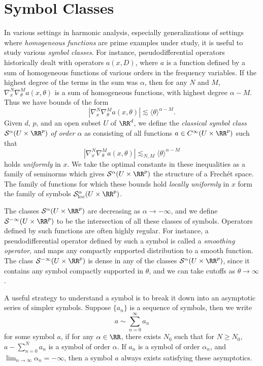 \chapter{Symbol Classes}

In various settings in harmonic analysis, especially generalizations of settings where \emph{homogeneous functions} are prime examples under study, it is useful to study various \emph{symbol classes}. For instance, pseudodifferential operators historically dealt with operators $a(x,D)$, where $a$ is a function defined by a sum of homogeneous functions of various orders in the frequency variables. If the highest degree of the terms in the sum was $\alpha$, then for any $N$ and $M$, $\nabla^N_x \nabla^M_\theta a(x,\theta)$ is a sum of homogeneous functions, with highest degree $\alpha - M$. Thus we have bounds of the form
%
\[ | \nabla^N_x \nabla^M_\theta a(x,\theta) | \lesssim \langle \theta \rangle^{\alpha - M}. \]
%
Given $d$, $p$, and an open subset $U$ of $\RR^d$, we define the \emph{classical symbol class} $\mathcal{S}^\alpha(U \times \RR^p)$ \emph{of order $\alpha$} as consisting of all functions $a \in C^\infty(U \times \RR^p)$ such that
%
\[ |\nabla^N_x \nabla^M_\theta a(x,\theta)| \lesssim_{N,M} \langle \theta \rangle^{\alpha - M} \]
%
holds \emph{uniformly} in $x$. We take the optimal constants in these inequalities as a family of seminorms which gives $\mathcal{S}^\alpha(U \times \RR^p)$ the structure of a Frech\'{e}t space. The family of functions for which these bounds hold \emph{locally uniformly} in $x$ form the family of symbols $\mathcal{S}^\alpha_{\text{loc}}(U \times \RR^p)$.

The classes $\mathcal{S}^\alpha(U \times \RR^p)$ are decreasing as $\alpha \to -\infty$, and we define $\mathcal{S}^{-\infty}(U \times \RR^p)$ to be the intersection of all these classes of symbols. Operators defined by such functions are often highly regular. For instance, a pseudodifferential operator defined by such a symbol is called a \emph{smoothing operator}, and maps any compactly supported distribution to a smooth function. The class $\mathcal{S}^{-\infty}(U \times \RR^p)$ is dense in any of the classes $\mathcal{S}^\alpha(U \times \RR^p)$, since it contains any symbol compactly supported in $\theta$, and we can take cutoffs as $\theta \to \infty$.

A useful strategy to understand a symbol is to break it down into an asymptotic series of simpler symbols. Suppose $\{ a_n \}$ is a sequence of symbols, then we write
%
\[ a \sim \sum_{n = 0}^\infty a_n \]
%
for some symbol $a$, if for any $\alpha \in \RR$, there exists $N_0$ such that for $N \geq N_0$, $a - \sum_{n = 0}^N a_n$ is a symbol of order $\alpha$. If $a_n$ is a symbol of order $\alpha_n$, and $\lim_{n \to \infty} \alpha_n = -\infty$, then a symbol $a$ always exists satisfying these asymptotics.

